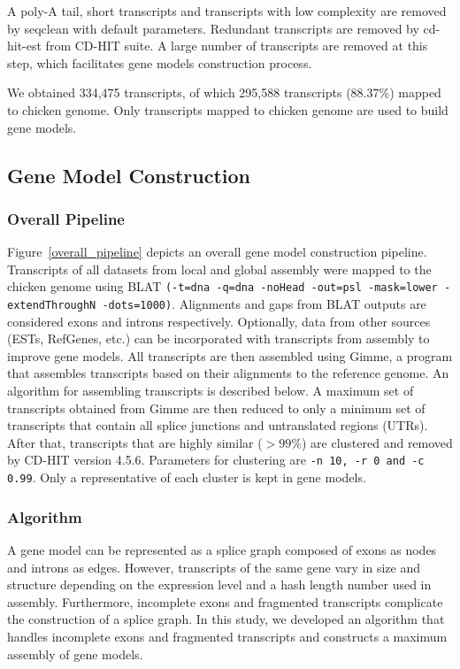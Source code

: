 \documentclass[10pt]{article}
\begin{document}
A poly-A tail, short transcripts and transcripts with low complexity are removed by
seqclean\cite{seqclean} with default parameters.
Redundant transcripts are removed by cd-hit-est from CD-HIT suite\cite{Li:2006hr}.
A large number of transcripts are removed at this step, which facilitates gene models construction process.

We obtained 334,475 transcripts, of which 295,588 transcripts (88.37\%) mapped to chicken genome.
Only transcripts mapped to chicken genome are used to build gene models.

\subsection*{Gene Model Construction}

\subsubsection*{Overall Pipeline}

Figure~\ref{overall_pipeline} depicts an overall gene model construction pipeline.
Transcripts of all datasets from local and global assembly were mapped to the chicken genome using
BLAT\cite{Kent:2002tv} \texttt{(-t=dna -q=dna -noHead -out=psl -mask=lower -extendThroughN -dots=1000)}.
Alignments and gaps from BLAT outputs are considered exons and introns respectively.
Optionally, data from other sources (ESTs, RefGenes, etc.) can be incorporated with transcripts from assembly to improve gene models.
All transcripts are then assembled using Gimme, a program that assembles transcripts based on their alignments to the reference genome.
An algorithm for assembling transcripts is described below.
A maximum set of transcripts obtained from Gimme are then reduced to only a minimum set of transcripts that contain
all splice junctions and untranslated regions (UTRs).
After that, transcripts that are highly similar ($>99\%$) are clustered and removed by CD-HIT version 4.5.6\cite{Li:2006hr}.
Parameters for clustering are \texttt{-n 10, -r 0 and -c 0.99}.
Only a representative of each cluster is kept in gene models.

\subsubsection*{Algorithm}

A gene model can be represented as a splice graph composed of exons as nodes and introns as edges.
However, transcripts of the same gene vary in size and structure depending on the expression level and a hash length number used in assembly.
Furthermore, incomplete exons and fragmented transcripts complicate the construction of a splice graph.
In this study, we developed an algorithm that handles incomplete exons and fragmented transcripts and constructs a maximum assembly of gene models.
\end{document}

